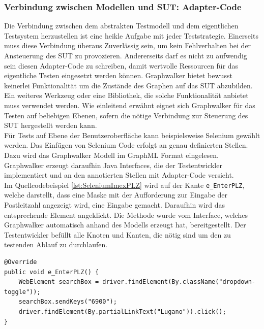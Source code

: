 \subsubsection{Verbindung zwischen Modellen und \Gls{SUT}: Adapter-Code}
Die Verbindung zwischen dem abstrakten Testmodell und dem eigentlichen Testsystem herzustellen ist eine heikle Aufgabe mit jeder Teststrategie. Einerseits muss diese Verbindung überaus Zuverlässig sein, um kein Fehlverhalten bei der Ansteuerung des \Gls{SUT} zu provozieren. Andererseits darf es nicht zu aufwendig sein diesen Adapter-Code zu schreiben, damit wertvolle Ressourcen für das eigentliche Testen eingesetzt werden können. Graphwalker bietet bewusst keinerlei Funktionalität um die Zustände des Graphen auf das \Gls{SUT} abzubilden. Ein weiteres Werkzeug oder eine Bibliothek, die solche Funktionalität anbietet muss verwendet werden. Wie einleitend erwähnt eignet sich Graphwalker für das Testen auf beliebigen Ebenen, sofern die nötige Verbindung zur Steuerung des \Gls{SUT} hergestellt werden kann.\\
Für Tests auf Ebene der Benutzeroberfläche kann beispielsweise Selenium gewählt werden. Das Einfügen von Selenium Code erfolgt an genau definierten Stellen. Dazu wird das Graphwalker Modell im GraphML Format eingelesen. Graphwalker erzeugt daraufhin Java Interfaces, die der Testentwickler implementiert und an den annotierten Stellen mit Adapter-Code versieht.\\
Im Quellcodebeispiel \ref{lst:SeleniumImexPLZ} wird auf der Kante \texttt{e\_EnterPLZ}, welche darstellt, dass eine Maske mit der Aufforderung zur Eingabe der Postleitzahl angezeigt wird, eine Eingabe gemacht. Daraufhin wird das entsprechende Element angeklickt. Die Methode wurde vom Interface, welches Graphwalker automatisch anhand des Modells erzeugt hat, bereitgestellt. Der Testentwickler befüllt alle Knoten und Kanten, die nötig sind um den zu testenden Ablauf zu durchlaufen. 

\begin{lstlisting}[caption={Auf einer Kante wird mittels Selenium eine Eingabe und ein Klick durchgeführt.}, label=lst:SeleniumImexPLZ, float]
@Override
public void e_EnterPLZ() {
    WebElement searchBox = driver.findElement(By.className("dropdown-toggle"));
    searchBox.sendKeys("6900");
    driver.findElement(By.partialLinkText("Lugano")).click();
}
\end{lstlisting}

